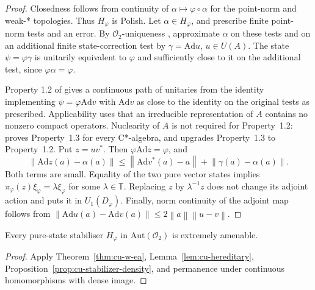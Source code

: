 \begin{proof}
Closedness follows from continuity of $\alpha\mapsto\varphi\circ\alpha$ for
the point-norm and weak-* topologies. Thus $H_\varphi$ is Polish. Let $\alpha\in H_\varphi$, and prescribe finite point-norm tests and an error. By 
$\mathcal{O}_2$-uniqueness \cite[Theorem 1.13]{KirchbergPhillips2000}, approximate $\alpha$ on
these tests and on an additional finite state-correction test by $\gamma=\mathrm{Ad} u$, $u\in U(A)$. The state $\psi=\varphi\gamma$ is unitarily
equivalent to $\varphi$ and sufficiently close to it on the additional test,
since $\varphi\alpha=\varphi$.

Property 1.2 of \cite{KishimotoOzawaSakai2003} gives a continuous path of unitaries from the
identity implementing $\psi=\varphi\mathrm{Ad} v$ with $\mathrm{Ad} v$ as
close to the identity on the original tests as prescribed. Applicability
uses that an irreducible representation of $A$ contains no nonzero compact
operators. Nuclearity of $A$ is not required for Property~1.2: \cite[Theorem~4.3]{KishimotoOzawaSakai2003} proves Property~1.3 for every C*-algebra, and \cite[Theorem~3.1]{KishimotoOzawaSakai2003} upgrades Property~1.3 to Property~1.2. Put $z=uv^*$. Then $\varphi\mathrm{Ad} z=\varphi$, and 
\begin{equation*}
\left\|\mathrm{Ad} z(a)-\alpha(a)\right\| \leq\left\|\mathrm{Ad}
v^*(a)-a\right\|+\left\|\gamma(a)-\alpha(a)\right\|.
\end{equation*}
Both terms are small. Equality of the two pure vector states implies $\pi_\varphi(z)\xi_\varphi=\lambda\xi_\varphi$ for some $\lambda\in\mathbb{T}$. Replacing $z$ by $\lambda^{-1}z$ does not change its adjoint action and
puts it in $U_1(D_\varphi)$. Finally, norm continuity of the adjoint map
follows from $\left\|\mathrm{Ad} u(a)-\mathrm{Ad} v(a)\right\|\leq2\left\|a\right\|\left\|u-v\right\|$.
\end{proof}

\begin{corollary}\label{cor:cu-h-ea}
 Every pure-state stabiliser $H_\varphi$ in $\mathrm{Aut}(\mathcal{O}_2)$ is extremely amenable.
\end{corollary}

\begin{proof}
Apply Theorem~\ref{thm:cu-w-ea}, Lemma~\ref{lem:cu-hereditary}, Proposition~\ref{prop:cu-stabilizer-density}, and permanence under continuous homomorphisms
with dense image.
\end{proof}

